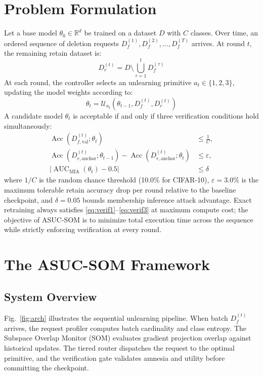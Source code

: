 \documentclass[conference]{IEEEtran}
\DeclareMathOperator{\Acc}{Acc}
\DeclareMathOperator{\AUC}{AUC}
\begin{document}
\section{Problem Formulation}
Let a base model $\theta_0 \in \mathbb{R}^d$ be trained on a dataset $D$ with $C$ classes. Over time, an ordered sequence of deletion requests $D_f^{(1)}, D_f^{(2)}, \dots, D_f^{(T)}$ arrives. At round $t$, the remaining retain dataset is:
\begin{equation}
D_r^{(t)} = D \setminus \bigcup_{\tau=1}^t D_f^{(\tau)}
\end{equation}
At each round, the controller selects an unlearning primitive $a_t \in \{1, 2, 3\}$, updating the model weights according to:
\begin{equation}
\theta_t = \mathcal{U}_{a_t}\left(\theta_{t-1}, D_f^{(t)}, D_r^{(t)}\right) \label{eq:update}
\end{equation}
A candidate model $\theta_t$ is acceptable if and only if three verification conditions hold simultaneously:
\begin{align}
\Acc\left(D_{f,\text{val}}^{(t)}; \theta_t\right) &\le \frac{1}{C}, \label{eq:verif1} \\
\Acc\left(D_{r,\text{anchor}}^{(t)}; \theta_{t-1}\right) - \Acc\left(D_{r,\text{anchor}}^{(t)}; \theta_t\right) &\le \varepsilon, \label{eq:verif2} \\
\left|\AUC_{\text{MIA}}(\theta_t) - 0.5\right| &\le \delta \label{eq:verif3}
\end{align}
where $1/C$ is the random chance threshold (10.0\% for CIFAR-10), $\varepsilon = 3.0\%$ is the maximum tolerable retain accuracy drop per round relative to the baseline checkpoint, and $\delta = 0.05$ bounds membership inference attack advantage. Exact retraining always satisfies \eqref{eq:verif1}--\eqref{eq:verif3} at maximum compute cost; the objective of ASUC-SOM is to minimize total execution time across the sequence while strictly enforcing verification at every round.

\section{The ASUC-SOM Framework}

\subsection{System Overview}
Fig.~\ref{fig:arch} illustrates the sequential unlearning pipeline. When batch $D_f^{(t)}$ arrives, the request profiler computes batch cardinality and class entropy. The Subspace Overlap Monitor (SOM) evaluates gradient projection overlap against historical updates. The tiered router dispatches the request to the optimal primitive, and the verification gate validates amnesia and utility before committing the checkpoint.
\end{document}
